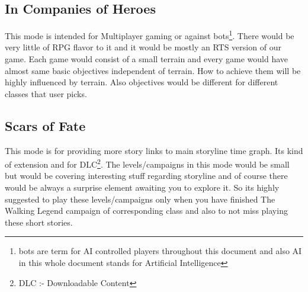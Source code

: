 \subsection{In Companies of Heroes}
This mode is intended for Multiplayer gaming or against bots\footnote{bots are term for AI controlled players throughout this document and also AI in this whole document stands for Artificial Intelligence}. There would be very little of RPG flavor to it and it would be mostly an RTS version of our game. Each game would consist of a small terrain and every game would have almost same basic objectives independent of terrain. How to achieve them will be highly influenced by terrain. Also objectives would be different for different classes that user picks.
\subsection{Scars of Fate}
This mode is for providing more story links to main storyline time graph. Its kind of extension and for DLC\footnote{DLC :- Downloadable Content}. The levels/campaigns in this mode would be small but would be covering interesting stuff regarding storyline and of course there would be always a surprise element awaiting you to explore it. So its highly suggested to play these levels/campaigns only when you have finished The Walking Legend campaign of corresponding class and also to not miss playing these short stories.